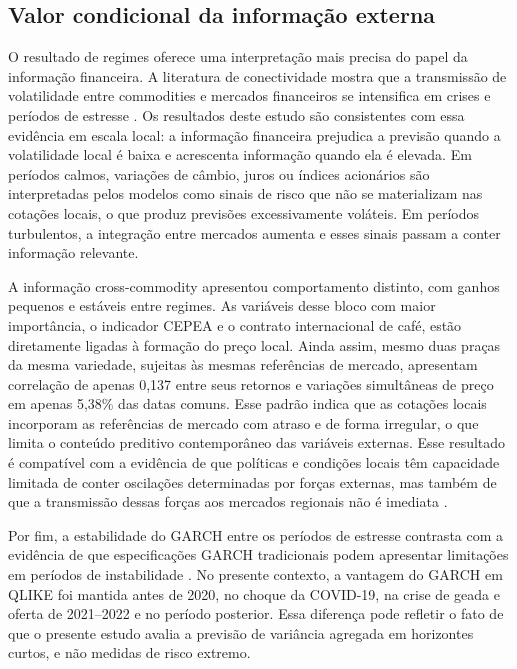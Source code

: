 \documentclass[a4paper,fleqn]{cas-sc}
\begin{document}
\subsection{Valor condicional da informação externa}
\label{subsec:disc_conditional}

O resultado de regimes oferece uma interpretação mais precisa do papel da informação financeira. A literatura de conectividade mostra que a transmissão de volatilidade entre commodities e mercados financeiros se intensifica em crises e períodos de estresse \citep{Singh2026OilSoftCommoditySpillovers,Zhou2026CommodityConnectedness}. Os resultados deste estudo são consistentes com essa evidência em escala local: a informação financeira prejudica a previsão quando a volatilidade local é baixa e acrescenta informação quando ela é elevada. Em períodos calmos, variações de câmbio, juros ou índices acionários são interpretadas pelos modelos como sinais de risco que não se materializam nas cotações locais, o que produz previsões excessivamente voláteis. Em períodos turbulentos, a integração entre mercados aumenta e esses sinais passam a conter informação relevante.

A informação cross-commodity apresentou comportamento distinto, com ganhos pequenos e estáveis entre regimes. As variáveis desse bloco com maior importância, o indicador CEPEA e o contrato internacional de café, estão diretamente ligadas à formação do preço local. Ainda assim, mesmo duas praças da mesma variedade, sujeitas às mesmas referências de mercado, apresentam correlação de apenas 0,137 entre seus retornos e variações simultâneas de preço em apenas 5,38\% das datas comuns. Esse padrão indica que as cotações locais incorporam as referências de mercado com atraso e de forma irregular, o que limita o conteúdo preditivo contemporâneo das variáveis externas. Esse resultado é compatível com a evidência de que políticas e condições locais têm capacidade limitada de conter oscilações determinadas por forças externas, mas também de que a transmissão dessas forças aos mercados regionais não é imediata \citep{Fahmi2023LocalCoffeePolicy,AliagaMiranda2026CoffeeShocks}.

Por fim, a estabilidade do GARCH entre os períodos de estresse contrasta com a evidência de que especificações GARCH tradicionais podem apresentar limitações em períodos de instabilidade \citep{Brun2026GARCHCoffeeRisk}. No presente contexto, a vantagem do GARCH em QLIKE foi mantida antes de 2020, no choque da COVID-19, na crise de geada e oferta de 2021--2022 e no período posterior. Essa diferença pode refletir o fato de que o presente estudo avalia a previsão de variância agregada em horizontes curtos, e não medidas de risco extremo.
\end{document}
